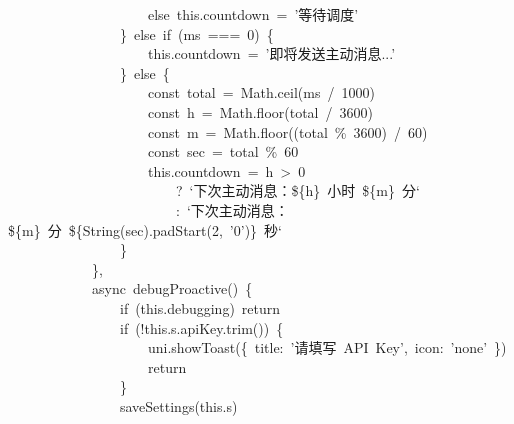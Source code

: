 \documentclass[a4paper,10pt]{article}
\begin{document}
{~~~~~~~~~~~~~~~~~~~~else~this.countdown~=~'等待调度'\\
~~~~~~~~~~~~~~~~\}~else~if~(ms~===~0)~\{\\
~~~~~~~~~~~~~~~~~~~~this.countdown~=~'即将发送主动消息...'\\
~~~~~~~~~~~~~~~~\}~else~\{\\
~~~~~~~~~~~~~~~~~~~~const~total~=~Math.ceil(ms~/~1000)\\
~~~~~~~~~~~~~~~~~~~~const~h~=~Math.floor(total~/~3600)\\
~~~~~~~~~~~~~~~~~~~~const~m~=~Math.floor((total~\%~3600)~/~60)\\
~~~~~~~~~~~~~~~~~~~~const~sec~=~total~\%~60\\
~~~~~~~~~~~~~~~~~~~~this.countdown~=~h~>~0\\
~~~~~~~~~~~~~~~~~~~~~~~~?~`下次主动消息：\$\{h\}~小时~\$\{m\}~分`\\
~~~~~~~~~~~~~~~~~~~~~~~~:~`下次主动消息：\$\{m\}~分~\$\{String(sec).padStart(2,~'0')\}~秒`\\
~~~~~~~~~~~~~~~~\}\\
~~~~~~~~~~~~\},\\
~~~~~~~~~~~~async~debugProactive()~\{\\
~~~~~~~~~~~~~~~~if~(this.debugging)~return\\
~~~~~~~~~~~~~~~~if~(!this.s.apiKey.trim())~\{\\
~~~~~~~~~~~~~~~~~~~~uni.showToast(\{~title:~'请填写~API~Key',~icon:~'none'~\})\\
~~~~~~~~~~~~~~~~~~~~return\\
~~~~~~~~~~~~~~~~\}\\
~~~~~~~~~~~~~~~~saveSettings(this.s)
}

\newpage
\end{document}
